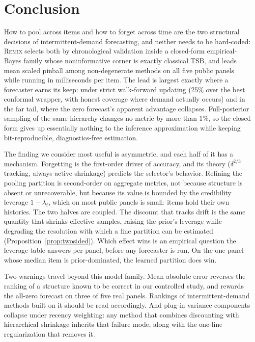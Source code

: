 \documentclass[twocolumn,10pt]{article}
\newcommand{\REMIX}{\textsc{Remix}}
\begin{document}
\section{Conclusion}\label{sec:conclusion}
How to pool across items and how to forget across time are the two
structural decisions of intermittent-demand forecasting, and neither
needs to be hard-coded: \REMIX{} selects both by chronological validation
inside a closed-form empirical-Bayes family whose noninformative corner
is exactly classical TSB, and leads mean scaled pinball among
non-degenerate methods on all five public panels while running in
milliseconds per item. The lead is largest exactly where a forecaster
earns its keep: under strict walk-forward updating (25\% over the best
conformal wrapper, with honest coverage where demand actually occurs)
and in the far tail, where the zero forecast's apparent advantage
collapses. Full-posterior sampling of the same hierarchy changes no
metric by more than $1\%$, so the closed form gives up essentially
nothing to the inference approximation while keeping bit-reproducible,
diagnostics-free estimation.

The finding we consider most useful is asymmetric, and each half of it
has a mechanism. Forgetting is the first-order driver of accuracy, and
its theory ($\delta^{2/3}$ tracking, always-active shrinkage) predicts
the selector's behavior. Refining the pooling partition is second-order
on aggregate metrics, not because structure is absent or unrecoverable,
but because its value is bounded by the credibility leverage
$1-\lambda_i$, which on most public panels is small: items hold their
own histories. The two halves are coupled. The discount that tracks
drift is the same quantity that shrinks effective samples, raising the
prior's leverage while degrading the resolution with which a fine
partition can be estimated (Proposition~\ref{prop:twosided}). Which
effect wins is an empirical question the leverage table answers per
panel, before any forecaster is run. On the one panel whose median item
is prior-dominated, the learned partition does win.

Two warnings travel beyond this model family. Mean absolute error
reverses the ranking of a structure known to be correct in our
controlled study, and rewards the all-zero forecast on three of five
real panels. Rankings of intermittent-demand methods built on it should
be read accordingly. And plug-in variance components collapse under
recency weighting: any method that combines discounting with
hierarchical shrinkage inherits that failure mode, along with the
one-line regularization that removes it.
\end{document}
